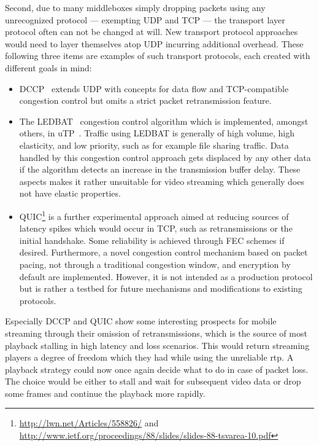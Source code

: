 Second, due to many middleboxes simply dropping packets using any unrecognized protocol --- exempting \gls{UDP} and \gls{TCP} --- the transport layer protocol often can not be changed at will. New transport protocol approaches would need to layer themselves atop \gls{UDP} incurring additional overhead. These following three items are examples of such transport protocols, each created with different goals in mind:

\begin{itemize}
	\item \gls{DCCP}~\cite{rfc4340} extends \gls{UDP} with concepts for data flow and \gls{TCP}-compatible congestion control but omits a strict packet retransmission feature.

	\item The \gls{LEDBAT}~\cite{rfc6817} congestion control algorithm which is implemented, amongst others, in \gls{uTP}~\cite{bt2010utp}. Traffic using \gls{LEDBAT} is generally of high volume, high elasticity, and low priority, such as for example file sharing traffic. Data handled by this congestion control approach gets displaced by any other data if the algorithm detects an increase in the transmission buffer delay. These aspects makes it rather unsuitable for video streaming which generally does not have elastic properties.

	\item \gls{QUIC}\footnote{\url{http://lwn.net/Articles/558826/} and \url{http://www.ietf.org/proceedings/88/slides/slides-88-tsvarea-10.pdf}} is a further experimental approach aimed at reducing sources of latency spikes which would occur in \gls{TCP}, such as retransmissions or the initial handshake. Some reliability is achieved through \gls{FEC} schemes if desired. Furthermore, a novel congestion control mechanism based on packet pacing, not through a traditional congestion window, and encryption by default are implemented. However, it is not intended as a production protocol but is rather a testbed for future mechanisms and modifications to existing protocols.
\end{itemize}
%
Especially \gls{DCCP} and \gls{QUIC} show some interesting prospects for mobile streaming through their omission of retransmissions, which is the source of most playback stalling in high latency and loss scenarios. This would return streaming players a degree of freedom which they had while using the unreliable \gls{rtp}. A playback strategy could now once again decide what to do in case of packet loss. The choice would be either to stall and wait for subsequent video data or drop some frames and continue the playback more rapidly.

